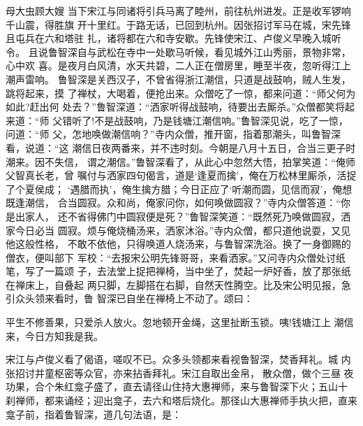 母大虫顾大嫂
当下宋江与同诸将引兵马离了睦州，前往杭州进发。正是收军锣响千山震，得胜旗
开十里红。于路无话，已回到杭州。因张招讨军马在城，宋先锋且屯兵在六和塔驻
扎，诸将都在六和寺安歇。先锋使宋江、卢俊义早晚入城听令。
且说鲁智深自与武松在寺中一处歇马听候，看见城外江山秀丽，景物非常，心中欢
喜。是夜月白风清，水天共碧，二人正在僧房里，睡至半夜，忽听得江上潮声雷响。
鲁智深是关西汉子，不曾省得浙江潮信，只道是战鼓响，贼人生发，跳将起来，摸
了禅杖，大喝着，便抢出来。众僧吃了一惊，都来问道：“师父何为如此?赶出何
处去？”鲁智深道：“洒家听得战鼓响，待要出去厮杀。”众僧都笑将起来道：“师
父错听了!不是战鼓响，乃是钱塘江潮信响。”鲁智深见说，吃了一惊，问道：“师
父，怎地唤做潮信响？”寺内众僧，推开窗，指着那潮头，叫鲁智深看，说道：“这
潮信日夜两番来，并不违时刻。今朝是八月十五日，合当三更子时潮来。因不失信，
谓之潮信。”鲁智深看了，从此心中忽然大悟，拍掌笑道：“俺师父智真长老，曾
嘱付与洒家四句偈言，道是‘逢夏而擒’，俺在万松林里厮杀，活捉了个夏侯成；
‘遇腊而执’，俺生擒方腊；今日正应了‘听潮而圆，见信而寂’，俺想既逢潮信，
合当圆寂。众和尚，俺家问你，如何唤做圆寂？”寺内众僧答道：“你是出家人，
还不省得佛门中圆寂便是死？”鲁智深笑道：“既然死乃唤做圆寂，洒家今日必当
圆寂。烦与俺烧桶汤来，洒家沐浴。”寺内众僧，都只道他说耍，又见他这般性格，
不敢不依他，只得唤道人烧汤来，与鲁智深洗浴。换了一身御赐的僧衣，便叫部下
军校：“去报宋公明先锋哥哥，来看洒家。”又问寺内众僧处讨纸笔，写了一篇颂
子，去法堂上捉把禅椅，当中坐了，焚起一炉好香，放了那张纸在禅床上，自叠起
两只脚，左脚搭在右脚，自然天性腾空。比及宋公明见报，急引众头领来看时，鲁
智深已自坐在禅椅上不动了。颂曰：

平生不修善果，只爱杀人放火。忽地顿开金绳，这里扯断玉锁。咦!钱塘江上
潮信来，今日方知我是我。

宋江与卢俊义看了偈语，嗟叹不已。众多头领都来看视鲁智深，焚香拜礼。城
内张招讨并童枢密等众官，亦来拈香拜礼。宋江自取出金帛，散众僧，做个三昼
夜功果，合个朱红龛子盛了，直去请径山住持大惠禅师，来与鲁智深下火；五山十
刹禅师，都来诵经；迎出龛子，去六和塔后烧化。那径山大惠禅师手执火把，直来
龛子前，指着鲁智深，道几句法语，是：

